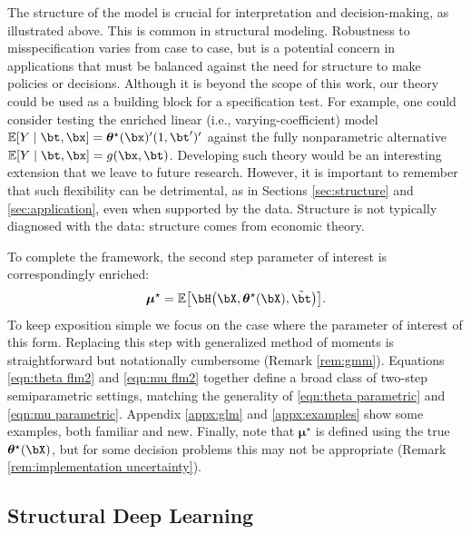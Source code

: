 \documentclass[12pt]{article}
\numberwithin{equation}{section}
\theoremstyle{definition}
\newcommand{\E}{\mathbb{E}}
\newcommand{\bmu}{\boldsymbol{\mu}}
\newcommand{\btheta}{\boldsymbol{\theta}}
\newcommand{\bmtrue}{\bmu^\star}
\newcommand{\bttrue}{\btheta^\star}
\newcommand{\btstar}{\tilde{\bt}}
\begin{document}
The structure of the model is crucial for interpretation and decision-making, as illustrated above. This is common in structural modeling. Robustness to misspecification varies from case to case, but is a potential concern in applications that must be balanced against the need for structure to make policies or decisions. Although it is beyond the scope of this work, our theory could be used as a building block for a specification test. For example, one could consider testing the enriched linear (i.e., varying-coefficient) model $\E[Y \mid \bt, \bx] = \bttrue(\bx)'(1,\bt')'$ against the fully nonparametric alternative $\E[Y \mid \bt, \bx] = g(\bx,\bt)$. Developing such theory would be an interesting extension that we leave to future research. However, it is important to remember that such flexibility can be detrimental, as in Sections \ref{sec:structure} and \ref{sec:application}, even when supported by the data. Structure is not typically diagnosed with the data: structure comes from economic theory.




To complete the framework, the second step parameter of interest is correspondingly enriched:
\begin{equation}
    \label{eqn:mu flm2}
    \bmtrue = \E\big[\bH\big(\bX, \bttrue(\bX), \btstar\big)\big].
\end{equation}
To keep exposition simple we focus on the case where the parameter of interest of this form. Replacing this step with generalized method of moments is straightforward but notationally cumbersome (Remark \ref{rem:gmm}). Equations \eqref{eqn:theta flm2} and \eqref{eqn:mu flm2} together define a broad class of two-step semiparametric settings, matching the generality of \eqref{eqn:theta parametric} and \eqref{eqn:mu parametric}. Appendix \ref{appx:glm} and \ref{appx:examples} show some examples, both familiar and new. Finally, note that $\bmtrue$ is defined using the true $\bttrue(\bX)$, but for some decision problems this may not be appropriate (Remark \ref{rem:implementation uncertainty}).






\subsection{Structural Deep Learning}
	\label{sec:dnn}
\end{document}
